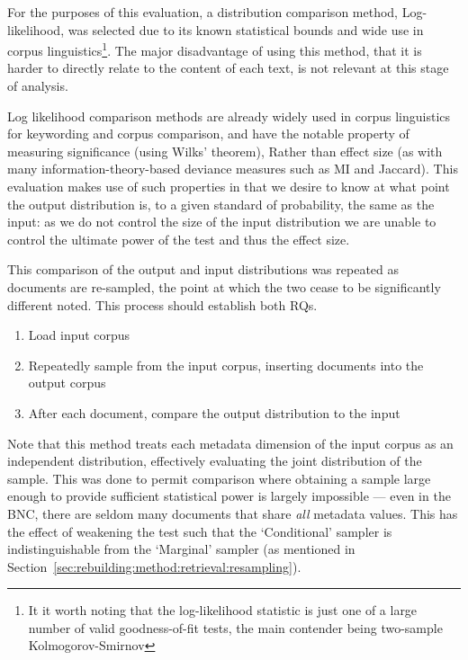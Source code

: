 For the purposes of this evaluation, a distribution comparison method, Log-likelihood, was selected due to its known statistical bounds and wide use in corpus linguistics\footnote{It it worth noting that the log-likelihood statistic is just one of a large number of valid goodness-of-fit tests, the main contender being two-sample Kolmogorov-Smirnov}.  The major disadvantage of using this method, that it is harder to directly relate to the content of each text, is not relevant at this stage of analysis.


Log likelihood comparison methods are already widely used in corpus linguistics for keywording and corpus comparison, and have the notable property of measuring significance (using Wilks' theorem), Rather than effect size (as with many information-theory-based deviance measures such as MI and Jaccard).  This evaluation makes use of such properties in that we desire to know at what point the output distribution is, to a given standard of probability, the same as the input: as we do not control the size of the input distribution we are unable to control the ultimate power of the test and thus the effect size.

This comparison of the output and input distributions was repeated as documents are re-sampled, the point at which the two cease to be significantly different noted.  This process should establish both RQs.

\begin{enumerate}
    \item Load input corpus
    \item Repeatedly sample from the input corpus, inserting documents into the output corpus
    \item After each document, compare the output distribution to the input
\end{enumerate}


Note that this method treats each metadata dimension of the input corpus as an independent distribution, effectively evaluating the joint distribution of the sample.  This was done to permit comparison where obtaining a sample large enough to provide sufficient statistical power is largely impossible --- even in the BNC, there are seldom many documents that share \textsl{all} metadata values.  This has the effect of weakening the test such that the `Conditional' sampler is indistinguishable from the `Marginal' sampler (as mentioned in Section~\ref{sec:rebuilding:method:retrieval:resampling}).


